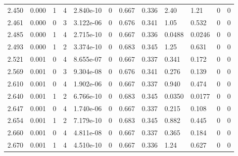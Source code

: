 \documentclass[preview]{standalone}
\begin{document}
{{{\begin{tabular}{L{1.2cm}C{1.2cm} C{0.3cm}C{0.5cm} C{1.4cm}C{1.4cm} C{1.4cm}C{1.4cm} C{1.6cm}C{1.6cm} C{1.6cm}C{1.6cm}}
  2.450  &  0.000  & 1     &  4 &  2.840e-10  & 0  &  0.667&   0.336& 2.40 & 1.21   &  0 & 0  \\ 
  2.461  &  0.000  & 0     &  3 &  3.122e-06  & 0  &  0.676&   0.341& 1.05 & 0.532   &  0 & 0  \\ 
  2.485  &  0.000  & 1     &  4 &  2.715e-10  & 0  &  0.667&   0.336& 0.0488 & 0.0246   &  0 & 0  \\ 
  2.493  &  0.000  & 1     &  2 &  3.374e-10  & 0  &  0.683&   0.345& 1.25 & 0.631   &  0 & 0  \\ 
  2.521  &  0.001  & 0     &  4 &  8.655e-07  & 0  &  0.667&   0.337& 0.341 & 0.172   &  0 & 0  \\ 
  2.569  &  0.001  & 0     &  3 &  9.304e-08  & 0  &  0.676&   0.341& 0.276 & 0.139   &  0 & 0  \\ 
  2.610  &  0.001  & 0     &  4 &  1.902e-06  & 0  &  0.667&   0.337& 0.940 & 0.474   &  0 & 0  \\ 
  2.640  &  0.001  & 1     &  2 &  6.766e-10  & 0  &  0.683&   0.345& 0.0350 & 0.0177   &  0 & 0  \\ 
  2.647  &  0.001  & 0     &  4 &  1.740e-06  & 0  &  0.667&   0.337& 0.215 & 0.108   &  0 & 0  \\ 
  2.654  &  0.001  & 1     &  2 &  7.179e-10  & 0  &  0.683&   0.345& 0.882 & 0.445   &  0 & 0  \\ 
  2.660  &  0.001  & 0     &  4 &  4.811e-08  & 0  &  0.667&   0.337& 0.365 & 0.184   &  0 & 0  \\ 
  2.670  &  0.001  & 1     &  4 &  4.510e-10  & 0  &  0.667&   0.336& 1.24 & 0.627   &  0 & 0  \\ 
\hline 
\end{tabular} 

}}}
\end{document}
